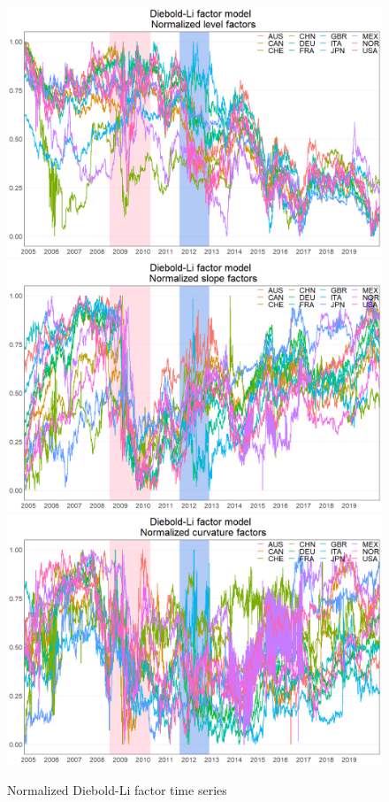 \documentclass{article}
\begin{document}
\begin{figure}[H]
\caption{Normalized Diebold-Li factor time series}
\includegraphics[width=11.5cm]{Normalizedlevel}
\includegraphics[width=11.5cm]{Normalizedslope}
\includegraphics[width=11.5cm]{Normalizedcurvature}
\centering
\end{figure}
\end{document}
